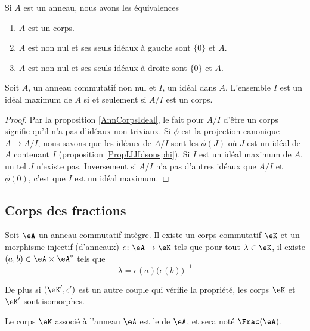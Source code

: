 \begin{proposition}     \label{AnnCorpsIdeal}
    Si \( A\) est un anneau, nous avons les équivalences
    \begin{enumerate}
        \item
            \( A\) est un corps.
        \item
            \( A\) est non nul et ses seuls idéaux à gauche sont \( \{ 0 \}\) et \( A\).
        \item
            \( A\) est non nul et ses seuls idéaux à droite sont \( \{ 0 \}\) et \( A\).
    \end{enumerate}
\end{proposition}

\begin{proposition}
    Soit \( A\), un anneau commutatif non nul et \( I\), un idéal dans \( A\). L'ensemble \( I\) est un idéal maximum de \( A\) si et seulement si \( A/I\) est un corps.
\end{proposition}

\begin{proof}
    Par la proposition \ref{AnnCorpsIdeal}, le fait pour \( A/I\) d'être un corps signifie qu'il n'a pas d'idéaux non triviaux. Si \( \phi\) est la projection canonique \( A\mapsto A/I\), nous savons que les idéaux de \( A/I\) sont les \( \phi(J)\) où \( J\) est un idéal de \( A\) contenant \( I\) (proposition \ref{PropIJJIdsousphi}). Si \( I\) est un idéal maximum de \( A\), un tel \( J\) n'existe pas. Inversement si \( A/I\) n'a pas d'autres idéaux que \( A/I\) et \( \phi(0)\), c'est que \( I\) est un idéal maximum.
\end{proof}

\subsection{Corps des fractions}

\begin{theorem}     \label{ThogbhWgo}
    Soit \( \eA\) un anneau commutatif intègre. Il existe un corps commutatif \( \eK\) et un morphisme injectif (d'anneaux) \( \epsilon\colon \eA\to \eK\) tels que pour tout \( \lambda\in\eK\), il existe \( (a,b)\in \eA\times \eA^*\) tels que
    \begin{equation}
        \lambda=\epsilon(a)\big( \epsilon(b) \big)^{-1}
    \end{equation}

    De plus si \( (\eK',\epsilon')\) est un autre couple qui vérifie la propriété, les corps \( \eK\) et \( \eK'\) sont isomorphes.
\end{theorem}
Le corps \( \eK\) associé à l'anneau \( \eA\) est le  de \( \eA\), et sera noté \( \Frac(\eA)\).

